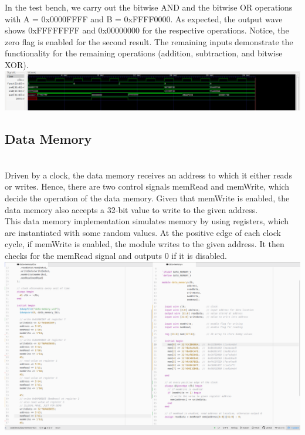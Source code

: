 \documentclass[twocolumn]{article}
\begin{document}
In the test bench, we carry out the bitwise AND and the bitwise OR operations with A = 0x0000FFFF and B = 0xFFFF0000. As expected, the output wave shows 0xFFFFFFFF and 0x00000000 for the respective operations. Notice, the zero flag is enabled for the second result. The remaining inputs demonstrate the functionality for the remaining operations (addition, subtraction, and bitwise XOR).\\

\begingroup
    \centering
    \medskip
    \includegraphics[width=\columnwidth]{Lab-Tex/Lab3-images/alu-wave.png}
    \medskip
\endgroup
\medskip

\subsection{Data Memory}
\\
Driven by a clock, the data memory receives an address to which it either reads or writes. Hence, there are two control signals memRead and memWrite, which decide the operation of the data memory. Given that memWrite is enabled, the data memory also accepts a 32-bit value to write to the given address.  \\

This data memory implementation simulates memory by using registers, which are instantiated with some random values. At the positive edge of each clock cycle, if memWrite is enabled, the module writes to the given address. It then checks for the memRead signal and outputs 0 if it is disabled. \\

\begingroup
    \centering
    \medskip
    \includegraphics[width=\columnwidth]{Lab-Tex/Lab3-images/data-memory.png}
    \medskip
\endgroup
\medskip
\end{document}
